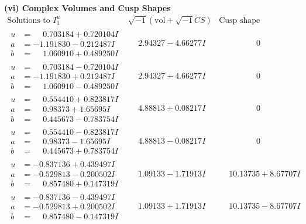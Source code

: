 \documentclass[1p]{elsarticle_modified}
\theoremstyle{definition}
\newcommand{\I}{\sqrt{-1}}
\begin{document}
\newpage\flushleft \textbf{(vi) Complex Volumes and Cusp Shapes}
$$\begin{array}{c|c|c}  
\text{Solutions to }I^u_{1}& \I (\text{vol} + \sqrt{-1}CS) & \text{Cusp shape}\\
 \hline 
\begin{aligned}
u &= \phantom{-}0.703184 + 0.720104 I \\
a &= -1.191830 - 0.212487 I \\
b &= \phantom{-}1.060910 + 0.489250 I\end{aligned}
 & \phantom{-}2.94327 - 4.66277 I & \phantom{-0.000000 } 0 \\ \hline\begin{aligned}
u &= \phantom{-}0.703184 - 0.720104 I \\
a &= -1.191830 + 0.212487 I \\
b &= \phantom{-}1.060910 - 0.489250 I\end{aligned}
 & \phantom{-}2.94327 + 4.66277 I & \phantom{-0.000000 } 0 \\ \hline\begin{aligned}
u &= \phantom{-}0.554410 + 0.823817 I \\
a &= \phantom{-}0.98373 + 1.65695 I \\
b &= \phantom{-}0.445673 - 0.783754 I\end{aligned}
 & \phantom{-}4.88813 + 0.08217 I & \phantom{-0.000000 } 0 \\ \hline\begin{aligned}
u &= \phantom{-}0.554410 - 0.823817 I \\
a &= \phantom{-}0.98373 - 1.65695 I \\
b &= \phantom{-}0.445673 + 0.783754 I\end{aligned}
 & \phantom{-}4.88813 - 0.08217 I & \phantom{-0.000000 } 0 \\ \hline\begin{aligned}
u &= -0.837136 + 0.439497 I \\
a &= -0.529813 - 0.200502 I \\
b &= \phantom{-}0.857480 + 0.147319 I\end{aligned}
 & \phantom{-}1.09133 - 1.71913 I & \phantom{-}10.13735 + 8.67707 I \\ \hline\begin{aligned}
u &= -0.837136 - 0.439497 I \\
a &= -0.529813 + 0.200502 I \\
b &= \phantom{-}0.857480 - 0.147319 I\end{aligned}
 & \phantom{-}1.09133 + 1.71913 I & \phantom{-}10.13735 - 8.67707 I \\ \hline\begin{aligned}

\end{aligned}
\end{array}$$
\end{document}
